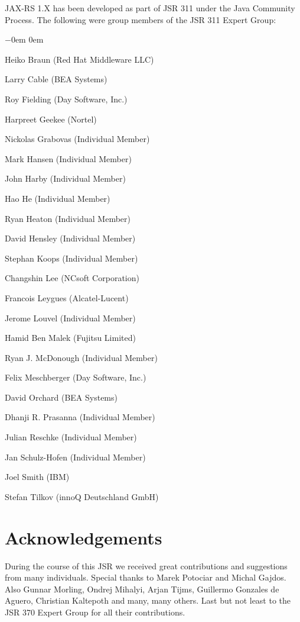 JAX-RS 1.X has been developed as part of JSR 311 under the Java Community Process. The following were group members of the JSR 311 Expert Group:

\begin{list}{$-$}{\parsep 0em  0em}
\item Heiko Braun (Red Hat Middleware LLC) 
\item Larry Cable (BEA Systems)
\item Roy Fielding (Day Software, Inc.)
\item Harpreet Geekee (Nortel)
\item Nickolas Grabovas (Individual Member)
\item Mark Hansen (Individual Member)
\item John Harby (Individual Member)
\item Hao He (Individual Member)
\item Ryan Heaton (Individual Member)
\item David Hensley (Individual Member) 
\item Stephan Koops (Individual Member)
\item Changshin Lee (NCsoft Corporation) 
\item Francois Leygues (Alcatel-Lucent) 
\item Jerome Louvel (Individual Member) 
\item Hamid Ben Malek (Fujitsu Limited) 
\item Ryan J. McDonough (Individual Member) 
\item Felix Meschberger (Day Software, Inc.) 
\item David Orchard (BEA Systems) 
\item Dhanji R. Prasanna (Individual Member) 
\item Julian Reschke (Individual Member) 
\item Jan Schulz-Hofen (Individual Member) 
\item Joel Smith (IBM) 
\item Stefan Tilkov (innoQ Deutschland GmbH)
\end{list}

\section{Acknowledgements}
\label{acks}

During the course of this JSR we received great contributions and suggestions from many individuals. Special thanks to Marek Potociar and Michal Gajdos. Also Gunnar Morling, Ondrej Mihalyi, Arjan Tijms, Guillermo Gonzales de Aguero, Christian Kaltepoth and many, many others. Last but not least to the JSR 370 Expert Group for all their contributions.

